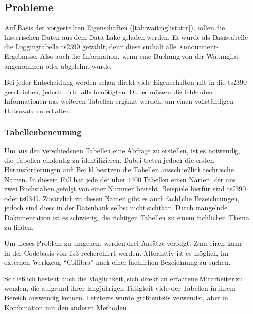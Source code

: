 \subsection{Probleme}
Auf Basis der vorgestellten Eigenschaften (\cref{tab:waitinglistattr}), sollen die historischen Daten aus dem Data Lake geladen werden. Es wurde als Basistabelle die Loggingtabelle \gls{ts2390} gewählt, denn diese enthält alle \hyperref[ref:announcement]{Annoucment}-Ergebnisse. Also auch die Information, wenn eine Buchung von der Waitinglist angenommen oder abgelehnt wurde. 

Bei jeder Entscheidung werden schon direkt viele Eigenschaften mit in die \gls{ts2390} geschrieben, jedoch nicht alle benötigten.
Daher müssen die fehlenden Informationen aus weiteren Tabellen ergänzt werden, um einen vollständigen Datensatz zu erhalten.



\subsubsection{Tabellenbenennung}

Um aus den verschiedenen Tabellen eine Abfrage zu erstellen, ist es notwendig, die Tabellen eindeutig zu identifizieren. 
Dabei treten jedoch die ersten Herausforderungen auf: Bei \gls{hl} besitzen die Tabellen ausschließlich technische Namen. 
In diesem Fall hat jede der über $1400$ Tabellen einen Namen, der aus zwei Buchstaben gefolgt von einer Nummer besteht. 
Beispiele hierfür sind \gls{ts2390} oder \gls{ts0340}. 
Zusätzlich zu diesen Namen gibt es auch fachliche Bezeichnungen, jedoch sind diese in der Datenbank selbst nicht sichtbar.
Durch mangelnde Dokumentation ist es schwierig, die richtigen Tabellen zu einem fachlichen Thema zu finden.

Um dieses Problem zu umgehen, werden drei Ansätze verfolgt. 
Zum einen kann in der Codebasis von \gls{fis}3 recherchiert werden. 
Alternativ ist es möglich, im externen Werkzeug \enquote{Collibra} nach einer fachlichen Bezeichnung zu suchen.


Schließlich besteht auch die Möglichkeit, sich direkt an erfahrene Mitarbeiter zu wenden, die aufgrund ihrer langjährigen Tätigkeit viele der Tabellen in ihrem Bereich auswendig kennen.
Letzteres wurde größtenteils verwendet, aber in Kombination mit den anderen Methoden.

